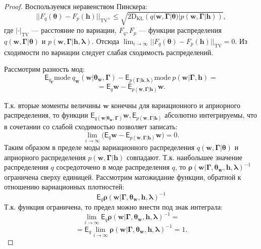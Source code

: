 \begin{proof}
Воспользуемся неравенством Пинскера:
\[
    ||F_q(\boldsymbol{\theta}) - F_p(\mathbf{h})||_\text{TV},\leq\sqrt{2\text{D}_\text{KL}\left(q(\mathbf{w}, \boldsymbol{\Gamma}|\boldsymbol{\theta})|p(\mathbf{w}, \boldsymbol{\Gamma}|\mathbf{h})\right)},
\]
где $|\cdot|_\text{TV}$ --- расстояние по вариации, $F_q, F_p$ --- функции распределения   $q(\mathbf{w},\boldsymbol{\Gamma}|\boldsymbol{\theta})$ и $p(\mathbf{w},\boldsymbol{\Gamma}| \mathbf{h}, \boldsymbol{\lambda})$.
Отсюда $ \lim_{i \to \infty} ||F_q(\boldsymbol{\theta}) - F_p(\mathbf{h})||_\text{TV} = 0.$
Из сходимости по вариации следует слабая сходимость распределений.

Рассмотрим разность мод:
\[
\mathsf{E}_{q_{\boldsymbol{\Gamma}}}\text{mode}~q_{\mathbf{w}}(\mathbf{w}|\boldsymbol{\theta}_\mathbf{w},\boldsymbol{\Gamma}) - \mathsf{E}_{p(\boldsymbol{\Gamma}|\mathbf{h}, \boldsymbol{\lambda})} \text{mode}~p(\mathbf{w}|\boldsymbol{\Gamma}, \mathbf{h}) =
\]
\[
= \mathsf{E}_{q}\mathbf{w} - \mathsf{E}_{p(\mathbf{w},\boldsymbol{\Gamma}|\mathbf{h})}\mathbf{w}.
\]

Т.к. вторые моменты величины $\mathbf{w}$ конечны для вариационного и априорного распределения, то функции $\mathsf{E}_{q(\mathbf{w}|\boldsymbol{\theta}_\mathbf{w},\boldsymbol{\Gamma})}\mathbf{w}, \mathsf{E}_{p(\mathbf{w},\boldsymbol{\Gamma}| \mathbf{h})}$ абсолютно интегрируемы, что в сочетании со слабой сходимостью позволяет записать:
\[
  \lim_{i \to \infty}\bigl( \mathsf{E}_{q}\mathbf{w} -  \mathsf{E}_{p(\mathbf{w},\boldsymbol{\Gamma}|\mathbf{h})}\mathbf{w} \bigr) = 0.
\]
Таким образом в пределе моды вариационного распределения $q(\mathbf{w},\boldsymbol{\Gamma}|\boldsymbol{\theta})$ и априорного распределения $p(\mathbf{w},\boldsymbol{\Gamma}| \mathbf{h})$ совпадают.
Т.к. наибольшее значение распределения $q$ сосредоточено в моде распределения $q$, то $\boldsymbol{\rho}(\mathbf{w}|\boldsymbol{\Gamma}, \boldsymbol{\theta}_\mathbf{w}, \mathbf{h},\boldsymbol{\lambda})^{-1}$ ограничена сверху единицей. Рассмотрим матожидание функции, обратной к отношению вариационных плотностей:
\[
\mathsf{E}_q \boldsymbol{\rho}(\mathbf{w}|\boldsymbol{\Gamma}, \boldsymbol{\theta}_\mathbf{w}, \mathbf{h},\boldsymbol{\lambda})^{-1}
\] 
Т.к. функция ограничена, то предел можно внести под знак интеграла:
\[
\lim_{i \to \infty} \mathsf{E}_q \boldsymbol{\rho}(\mathbf{w}|\boldsymbol{\Gamma}, \boldsymbol{\theta}_\mathbf{w}, \mathbf{h},\boldsymbol{\lambda})^{-1} = 
\]
\[
 =\mathsf{E}_q  \lim_{i \to \infty}  \boldsymbol{\rho}(\mathbf{w}|\boldsymbol{\Gamma}, \boldsymbol{\theta}_\mathbf{w}, \mathbf{h},\boldsymbol{\lambda})^{-1} = 1.
\]

\end{proof}

